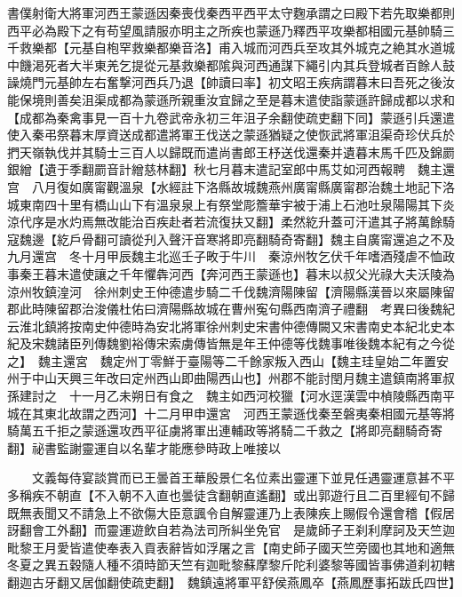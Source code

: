 書僕射衛大將軍河西王蒙遜因秦喪伐秦西平西平太守麴承謂之曰殿下若先取樂都則西平必為殿下之有苟望風請服亦明主之所疾也蒙遜乃釋西平攻樂都相國元基帥騎三千救樂都【元基自枹罕救樂都樂音洛】甫入城而河西兵至攻其外城克之絶其水道城中饑渇死者大半東羌乞提從元基救樂都隂與河西通謀下繩引内其兵登城者百餘人鼓譟燒門元基帥左右奮撃河西兵乃退【帥讀曰率】初文昭王疾病謂暮末曰吾死之後汝能保境則善矣沮渠成都為蒙遜所親重汝宜歸之至是暮末遣使詣蒙遜許歸成都以求和【成都為秦禽事見一百十九卷武帝永初三年沮子余翻使疏吏翻下同】蒙遜引兵還遣使入秦弔祭暮末厚資送成都遣將軍王伐送之蒙遜猶疑之使恢武將軍沮渠奇珍伏兵於捫天嶺執伐并其騎士三百人以歸既而遣尚書郎王杼送伐還秦并遺暮末馬千匹及錦罽銀繒【遺于季翻罽音計繒慈林翻】秋七月暮末遣記室郎中馬艾如河西報聘　魏主還宫　八月復如廣甯觀溫泉【水經註下洛縣故城魏燕州廣甯縣廣甯郡治魏土地記下洛城東南四十里有橋山山下有溫泉泉上有祭堂彫簷華宇被于浦上石池吐泉陽陽其下炎涼代序是水灼焉無改能治百疾赴者若流復扶又翻】柔然紇升蓋可汗遣其子將萬餘騎寇魏邊【紇戶骨翻可讀從刋入聲汗音寒將即亮翻騎奇寄翻】魏主自廣甯還追之不及九月還宫　冬十月甲辰魏主北巡壬子畋于牛川　秦涼州牧乞伏千年嗜酒殘虐不恤政事秦王暮末遣使讓之千年懼犇河西【奔河西王蒙遜也】暮末以叔父光祿大夫沃陵為涼州牧鎮湟河　徐州刺史王仲德遣步騎二千伐魏濟陽陳留【濟陽縣漢晉以來屬陳留郡此時陳留郡治浚儀杜佑曰濟陽縣故城在曹州寃句縣西南濟子禮翻　考異曰後魏紀云淮北鎮將按南史仲德時為安北將軍徐州刺史宋書仲德傳闕又宋書南史本紀北史本紀及宋魏諸臣列傳魏劉裕傳宋索虜傳皆無是年王仲德等伐魏事唯後魏本紀有之今從之】　魏主還宮　魏定州丁零鮮于臺陽等二千餘家叛入西山【魏主珪皇始二年置安州于中山天興三年改曰定州西山即曲陽西山也】州郡不能討閏月魏主遣鎮南將軍叔孫建討之　十一月乙未朔日有食之　魏主如西河校獵【河水逕漢雲中楨陵縣西南平城在其東北故謂之西河】十二月甲申還宮　河西王蒙遜伐秦至磐夷秦相國元基等將騎萬五千拒之蒙遜還攻西平征虜將軍出連輔政等將騎二千救之【將即亮翻騎奇寄翻】祕書監謝靈運自以名輩才能應參時政上唯接以

　　文義每侍宴談賞而已王曇首王華殷景仁名位素出靈運下並見任遇靈運意甚不平多稱疾不朝直【不入朝不入直也曇徒含翻朝直遙翻】或出郭遊行且二百里經旬不歸既無表聞又不請急上不欲傷大臣意諷令自解靈運乃上表陳疾上賜假令還會稽【假居訝翻會工外翻】而靈運遊飲自若為法司所糾坐免官　是歲師子王刹利摩訶及天竺迦毗黎王月愛皆遣使奉表入貢表辭皆如浮屠之言【南史師子國天竺旁國也其地和適無冬夏之異五穀隨人種不須時節天竺有迦毗黎蘇摩黎斤陀利婆黎等國皆事佛道刹初轄翻迦古牙翻又居伽翻使疏吏翻】　魏鎮遠將軍平舒侯燕鳳卒【燕鳳歷事拓跋氏四世】

